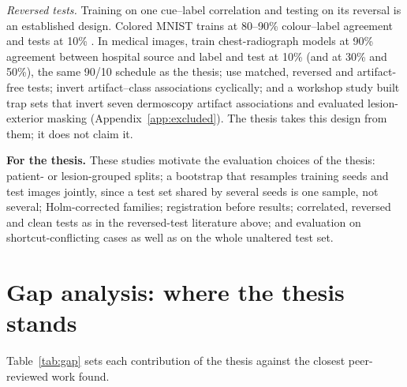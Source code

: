\documentclass[11pt,a4paper]{article}
\newcommand{\takeaway}[1]{\par\smallskip\noindent\colorbox{gray!12}{\parbox{\dimexpr\linewidth-2\fboxsep}{\small\textbf{For the thesis.} #1}}\par\medskip}
\begin{document}
\emph{Reversed tests.} Training on one cue--label correlation and testing on its reversal is an established design.
Colored MNIST trains at 80--90\% colour--label agreement and tests at 10\% \citep{arjovsky2019irm}. In medical images,
\citet{puli2022nurd} train chest-radiograph models at 90\% agreement between hospital source and label and test at
10\% (and at 30\% and 50\%), the same 90/10 schedule as the thesis; \citet{bassi2024isnet} use matched, reversed and
artifact-free tests; \citet{corbetta2026beyond} invert artifact--class associations cyclically; and a workshop study
built trap sets that invert seven dermoscopy artifact associations and evaluated lesion-exterior masking
(Appendix~\ref{app:excluded}). The thesis takes this design from them; it does not claim it.
\takeaway{These studies motivate the evaluation choices of the thesis: patient- or lesion-grouped splits; a bootstrap
that resamples training seeds and test images jointly, since a test set shared by several seeds is one sample, not
several; Holm-corrected families; registration before results; correlated, reversed and clean tests as in the
reversed-test literature above; and evaluation on shortcut-conflicting cases as well as on the whole unaltered test
set.}

\section{Gap analysis: where the thesis stands}\label{sec:gap}
Table~\ref{tab:gap} sets each contribution of the thesis against the closest peer-reviewed work found.
\end{document}
